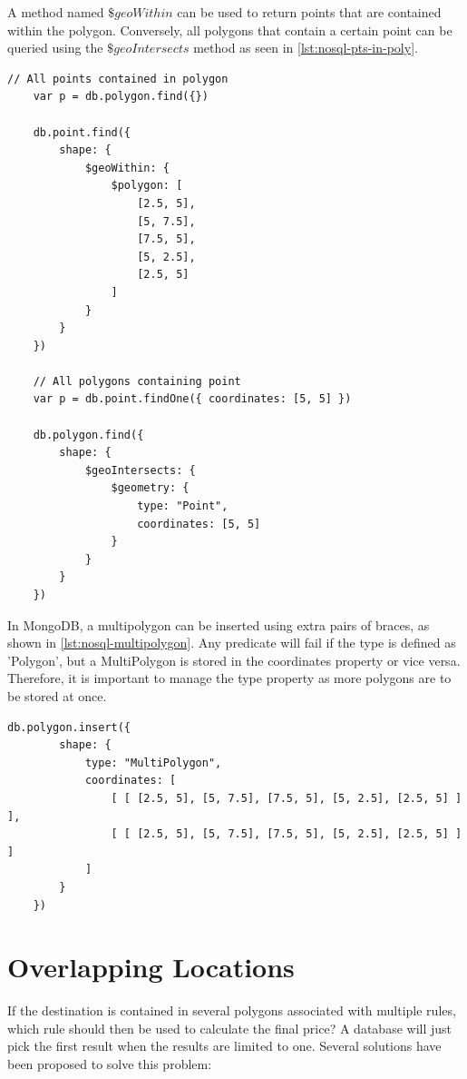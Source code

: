 A method named $\$geoWithin$ can be used to return points that are contained within the polygon. Conversely, all polygons that contain a certain point can be queried using the $\$geoIntersects$ method as seen in \ref{lst:nosql-pts-in-poly}.

\begin{center}
\noindent\begin{minipage}{.85\textwidth}
\begin{lstlisting}[caption={Select points contained in polygon, and all polygons containing a point in MongoDB.}, label={lst:nosql-pts-in-poly}]
	// All points contained in polygon
	var p = db.polygon.find({})

	db.point.find({
		shape: {
			$geoWithin: {
				$polygon: [
					[2.5, 5],
					[5, 7.5],
					[7.5, 5],
					[5, 2.5],
					[2.5, 5]
				]
			}
		}
	})

	// All polygons containing point
	var p = db.point.findOne({ coordinates: [5, 5] })

	db.polygon.find({
		shape: {
			$geoIntersects: {
				$geometry: {
					type: "Point",
					coordinates: [5, 5]
				}
			}
		}
	})
\end{lstlisting}
\end{minipage}
\end{center}

In MongoDB, a multipolygon can be inserted using extra pairs of braces, as shown in \ref{lst:nosql-multipolygon}. Any predicate will fail if the type is defined as 'Polygon', but a MultiPolygon is stored in the coordinates property or vice versa. Therefore, it is important to manage the type property as more polygons are to be stored at once.

\begin{center}
\noindent\begin{minipage}{.85\textwidth}
\begin{lstlisting}[caption={Insert one multipolygon in MongoDB.}, label={lst:nosql-multipolygon}]
	db.polygon.insert({
		shape: {
			type: "MultiPolygon",
			coordinates: [
				[ [ [2.5, 5], [5, 7.5], [7.5, 5], [5, 2.5], [2.5, 5] ] ],
				[ [ [2.5, 5], [5, 7.5], [7.5, 5], [5, 2.5], [2.5, 5] ] ]
			]
		}
	})
\end{lstlisting}
\end{minipage}
\end{center}

\section{Overlapping Locations}
If the destination is contained in several polygons associated with multiple rules, which rule should then be used to calculate the final price? A database will just pick the first result when the results are limited to one. Several solutions have been proposed to solve this problem:

